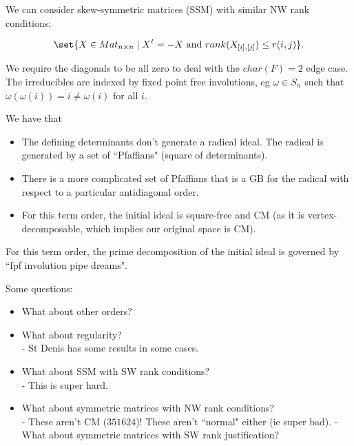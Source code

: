 We can consider skew-symmetric matrices (SSM) with similar NW rank conditions:

\begin{align*}
    \set{ X \in Mat_{n \times n} \mid X^t = - X \text{ and } rank (X_{[i], [j]} ) \leq r(i,j)  }.
\end{align*}

We require the diagonals to be all zero to deal with the $char( F) = 2$ edge case. The irreducibles are indexed by fixed point free involutions, eg $\omega \in S_n $ such that $\omega ( \omega (i) ) = i \neq \omega (i) $ for all $i$.

\begin{theorem}
    We have that
    \begin{itemize}
        \item The defining determinants don't generate a radical ideal. The radical is generated by a set of ``Pfaffians" (square of determinants).
        \item There is a more complicated set of Pfaffians that is a GB for the radical with respect to a particular antidiagonal order.
        \item For this term order, the initial ideal is square-free and CM (as it is vertex-decomposable, which implies our original space is CM).
    \end{itemize}
    For this term order, the prime decomposition of the initial ideal is governed by ``fpf involution pipe dreams".
\end{theorem}

\begin{remark}
    Some questions:
    \begin{itemize}
        \item What about other orders?
        \item What about regularity?\\
        - St Denis has some results in some cases.
        \item What about SSM with SW rank conditions?\\
        - This is super hard.
        \item What about symmetric matrices with NW rank conditions?\\
        - These aren't CM ($351624$)! These aren't ``normal" either (ie super bad).
        - What about symmetric matrices with SW rank justification?
    \end{itemize}
\end{remark}

